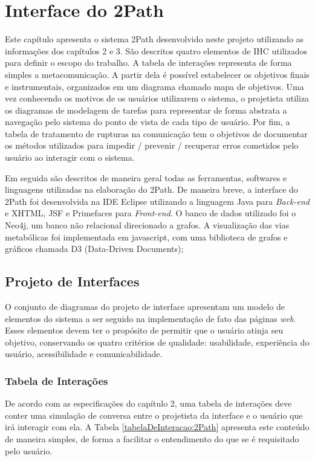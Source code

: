 \chapter{Interface do 2Path}

\indent Este capítulo apresenta o sistema 2Path desenvolvido neste projeto utilizando as informações dos capítulos 2 e 3. São descritos quatro elementos de IHC utilizados para definir o escopo do trabalho. A tabela de interações representa de forma simples a metacomunicação. A partir dela é possível estabelecer os objetivos finais e instrumentais, organizados em um diagrama chamado mapa de objetivos. Uma vez conhecendo os motivos de os usuários utilizarem o sistema, o projetista utiliza os diagramas de modelagem de tarefas para representar de forma abstrata a navegação pelo sistema do ponto de vista de cada tipo de usuário. Por fim, a tabela de tratamento de rupturas na comunicação tem o objetivos de documentar os métodos utilizados para impedir / prevenir / recuperar erros cometidos pelo usuário ao interagir com o sistema.

\indent Em seguida são descritos de maneira geral todas as ferramentas, softwares e linguagens utilizadas na elaboração do 2Path. De maneira breve, a interface do 2Path foi desenvolvida na IDE Eclipse utilizando a linguagem Java para \textit{Back-end} e XHTML, JSF e Primefaces para \textit{Front-end}. O banco de dados utilizado foi o Neo4j, um banco não relacional direcionado a grafos. A visualização das vias metabólicas foi implementada em javascript, com uma biblioteca de grafos e gráficos chamada D3 (Data-Driven Documents);

\section{Projeto de Interfaces}

\indent O conjunto de diagramas do projeto de interface apresentam um modelo de elementos do sistema a ser seguido na implementação de fato das páginas \textit{web}. Esses elementos devem ter o propósito de permitir que o usuário atinja seu objetivo, conservando os quatro critérios de qualidade: usabilidade, experiência do usuário, acessibilidade e comunicabilidade.

\subsection{Tabela de Interações}

\indent De acordo com as especificações do capítulo 2, uma tabela de interações deve conter uma simulação de conversa entre o projetista da interface e o usuário que irá interagir com ela. A Tabela \ref{tabelaDeInteracao:2Path} apresenta este conteúdo de maneira simples, de forma a facilitar o entendimento do que se é requisitado pelo usuário. 

